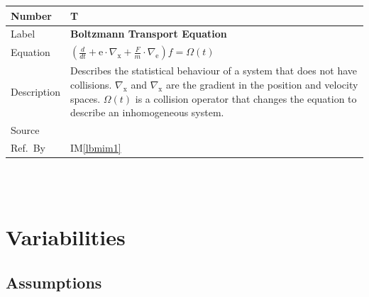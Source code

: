 \documentclass[12pt]{article}
\newcommand{\colAwidth}{0.13\textwidth}
\newcommand{\colBwidth}{0.82\textwidth}
\newcounter{theorynum} %
\begin{document}
\noindent
\begin{minipage}{\textwidth}
	\renewcommand*{\arraystretch}{1.5}
	\begin{tabular}{| p{\colAwidth} | p{\colBwidth}|}
		\hline
		\rowcolor[gray]{0.9}
		Number& T{theorynum}\thetheorynum \label{T_BTE}\\
		\hline
		Label&\bf Boltzmann Transport Equation\\
		\hline
		Equation&  $(\frac{d}{dt} + \mathrm{e} \cdot \nabla_\mathrm{x} + \frac{F}{m} \cdot \nabla_\mathrm{e})f = \Omega(t)$\\
		\hline
		Description & 
		Describes the statistical behaviour of a system that does not have collisions. $\nabla_\mathrm{x}$ and $\nabla_\mathrm{x}$ are the gradient in the position and velocity spaces. $\Omega(t)$ is a collision operator that changes the equation to describe an inhomogeneous system.\\
		\hline
		Source &
		\citet{gibiansky}\\
		\hline
		Ref.\ By & IM\ref{lbmim1}\\
		\hline
	\end{tabular}
\end{minipage}\\

~\newline
~\newpage

\section{Variabilities}
\label{variabilities}

\subsection{Assumptions}
\end{document}

